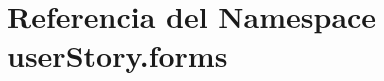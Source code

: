\hypertarget{namespaceuser_story_1_1forms}{}\section{Referencia del Namespace user\+Story.\+forms}
\label{namespaceuser_story_1_1forms}
